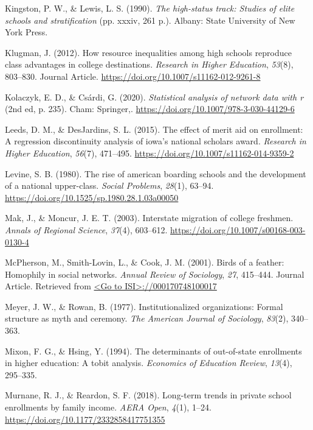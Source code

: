 \documentclass[
  12pt,
]{article}
\newlength{\cslhangindent}
\newenvironment{CSLReferences}[2] %
 {\begin{list}{}{%
  \setlength{\itemindent}{0pt}
  \setlength{\leftmargin}{0pt}
  \setlength{\parsep}{0pt}
  \ifodd #1
   \setlength{\leftmargin}{\cslhangindent}
   \setlength{\itemindent}{-1\cslhangindent}
  \fi
  \setlength{\itemsep}{#2\baselineskip}}}
 {\end{list}}
\begin{document}
\begin{CSLReferences}{1}{0}
Kingston, P. W., \& Lewis, L. S. (1990). \emph{The high-status track: Studies of elite schools and stratification} (pp. xxxiv, 261 p.). Albany: State University of New York Press.

Klugman, J. (2012). How resource inequalities among high schools reproduce class advantages in college destinations. \emph{Research in Higher Education}, \emph{53}(8), 803--830. Journal Article. \url{https://doi.org/10.1007/s11162-012-9261-8}

Kolaczyk, E. D., \& Csárdi, G. (2020). \emph{Statistical analysis of network data with r} (2nd ed, p. 235). Cham: Springer,. \url{https://doi.org/10.1007/978-3-030-44129-6}

Leeds, D. M., \& DesJardins, S. L. (2015). The effect of merit aid on enrollment: A regression discontinuity analysis of iowa's national scholars award. \emph{Research in Higher Education}, \emph{56}(7), 471--495. \url{https://doi.org/10.1007/s11162-014-9359-2}

Levine, S. B. (1980). The rise of american boarding schools and the development of a national upper-class. \emph{Social Problems}, \emph{28}(1), 63--94. \url{https://doi.org/10.1525/sp.1980.28.1.03a00050}

Mak, J., \& Moncur, J. E. T. (2003). Interstate migration of college freshmen. \emph{Annals of Regional Science}, \emph{37}(4), 603--612. \url{https://doi.org/10.1007/s00168-003-0130-4}

McPherson, M., Smith-Lovin, L., \& Cook, J. M. (2001). Birds of a feather: Homophily in social networks. \emph{Annual Review of Sociology}, \emph{27}, 415--444. Journal Article. Retrieved from \href{\%3CGo\%20to\%20ISI\%3E://000170748100017}{\textless Go to ISI\textgreater://000170748100017}

Meyer, J. W., \& Rowan, B. (1977). Institutionalized organizations: Formal structure as myth and ceremony. \emph{The American Journal of Sociology}, \emph{83}(2), 340--363.

Mixon, F. G., \& Hsing, Y. (1994). The determinants of out-of-state enrollments in higher education: A tobit analysis. \emph{Economics of Education Review}, \emph{13}(4), 295--335.

Murnane, R. J., \& Reardon, S. F. (2018). Long-term trends in private school enrollments by family income. \emph{AERA Open}, \emph{4}(1), 1--24. \url{https://doi.org/10.1177/2332858417751355}


\end{CSLReferences}
\end{document}

